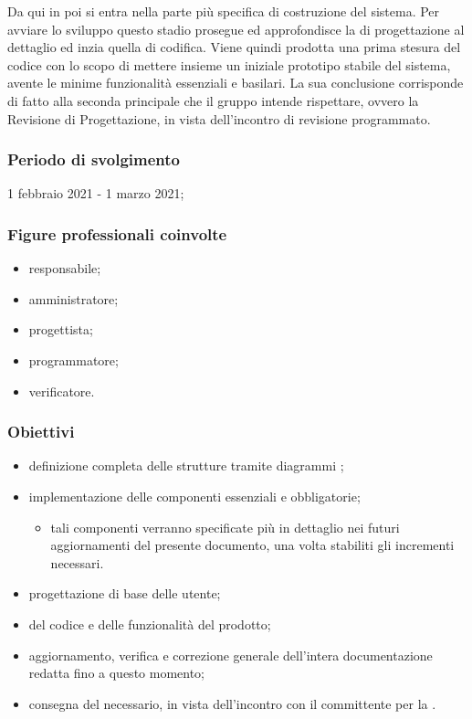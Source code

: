 Da qui in poi si entra nella parte più specifica di costruzione del sistema. Per avviare lo sviluppo questo stadio prosegue ed approfondisce la  di progettazione al dettaglio ed inzia quella di codifica. Viene quindi prodotta una prima stesura del codice con lo scopo di mettere insieme un iniziale prototipo stabile del sistema, avente le minime funzionalità essenziali e basilari. La sua conclusione corrisponde di fatto alla seconda  principale che il gruppo \Gruppo{} intende rispettare, ovvero la Revisione di Progettazione, in vista dell'incontro di revisione programmato.
        
        \subsubsection{Periodo di svolgimento}
        1 febbraio 2021 - 1 marzo 2021;
        
        \subsubsection{Figure professionali coinvolte}
            \begin{itemize}
                \item responsabile;
                \item amministratore;
                \item progettista;
                \item programmatore;
                \item verificatore.
            \end{itemize}

        \subsubsection{Obiettivi}    
        \begin{itemize}
            \item definizione completa delle strutture tramite diagrammi ;
            \item implementazione delle componenti essenziali e obbligatorie;
            \begin{itemize}
                \item tali componenti verranno specificate più in dettaglio nei futuri aggiornamenti del presente documento, una volta stabiliti gli incrementi necessari.
            \end{itemize}
            \item progettazione di base delle  utente;
            \item {} del codice e delle funzionalità del prodotto;
            \item aggiornamento, verifica e correzione generale dell'intera documentazione redatta fino a questo momento;
            \item consegna del  necessario, in vista dell'incontro con il committente per la \RP{}.
        \end{itemize}